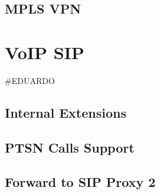\documentclass[11pt,a4paper]{report}
\begin{document}
\section{MPLS VPN}


\chapter{VoIP SIP}
\#EDUARDO
\section{Internal Extensions}
\section{PTSN Calls Support}
\section{Forward to SIP Proxy 2}


\lstlistoflistings


\end{document}
